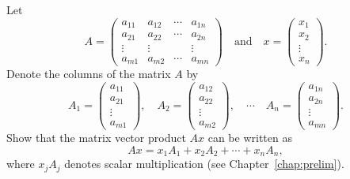 \documentclass{article}
\begin{document}
\begin{exercise} \label{c4.1.b3}
Let
\[
A=\left(
\begin{array}{rrrr}
 a_{11} & a_{12} & \cdots & a_{1n} \\
 a_{21} & a_{22} & \cdots & a_{2n}  \\
 \vdots & \vdots &        & \vdots  \\
 a_{m1} & a_{m2} & \cdots & a_{mn}
\end{array}
\right)\quad\mbox{and}\quad
x =
\left( \begin{array}{r} x_1\\ x_2\\ \vdots\\ x_n\end{array}\right).
\]
Denote the columns of the matrix $A$ by
\[
A_1 =
\left(\begin{array}{c} a_{11}\\ a_{21}\\ \vdots\\
a_{m1}\end{array}\right),\quad
A_2 =
\left(\begin{array}{c} a_{12}\\ a_{22}\\ \vdots\\
a_{m2}\end{array}\right),\quad
\cdots\quad
A_n =
\left(\begin{array}{c} a_{1n}\\ a_{2n}\\ \vdots\\ a_{mn}\end{array}\right).
\]
Show that the matrix vector product $Ax$ can be written as
\[
Ax = x_1 A_1 + x_2 A_2 + \cdots + x_n A_n,
\]
where $x_j A_j$ denotes scalar multiplication (see Chapter~\ref{chap:prelim}).

\begin{solution}


\end{solution}
\end{exercise}
\end{document}
